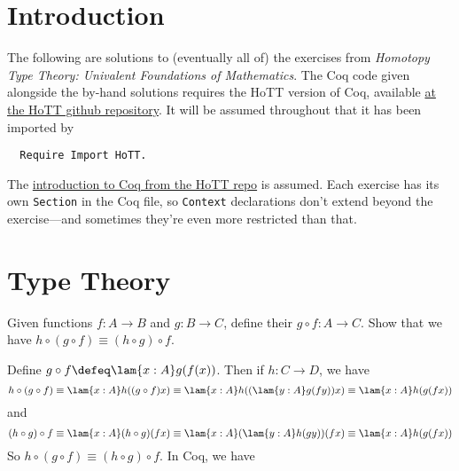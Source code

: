 \section*{Introduction}

The following are solutions to (eventually all of) the exercises from
\emph{Homotopy Type Theory: Univalent Foundations of Mathematics}.  The Coq
code given alongside the by-hand solutions requires the HoTT version of Coq,
available \href{https://github.com/HoTT}{at the HoTT github repository}.  It
will be assumed throughout that it has been imported by
\begin{lstlisting}
  Require Import HoTT.
\end{lstlisting}
The
\href{https://github.com/HoTT/book/blob/master/coq_introduction/Reading_HoTT_in_Coq.v}{introduction
to Coq from the HoTT repo} is assumed.  Each exercise has its own
\lstinline|Section| in the Coq file, so \lstinline|Context| declarations don't
extend beyond the exercise---and sometimes they're even more restricted than
that.

\section{Type Theory}

  Given functions $f:A\to B$ and $g:B\to C$, define
their  $g \circ f : A \to C$.  Show that we have $h \circ (g
\circ f) \equiv (h \circ g) \circ f$.

\soln
Define $g \circ f \defeq \lam{x:A}g(f(x))$.  Then if $h:C \to D$, we
have
\[
  h \circ (g \circ f) 
  \equiv \lam{x:A}h((g \circ f)x)
  \equiv \lam{x:A}h((\lam{y:A}g(fy))x)
  \equiv \lam{x:A}h(g(fx))
\]
and
\[
  (h \circ g) \circ f 
  \equiv \lam{x:A}(h \circ g)(fx)
  \equiv \lam{x:A}(\lam{y:A}h(gy))(fx)
  \equiv \lam{x:A}h(g(fx))
\]
So $h \circ (g \circ f) \equiv (h \circ g) \circ f$.  In Coq, we have

\nwenddocs{}\endmoddef
{}               
         

